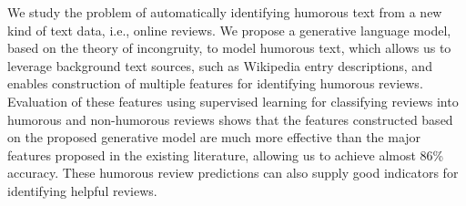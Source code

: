 We study the problem of automatically identifying humorous text from a new kind of text data, i.e., online reviews. We propose a generative language model, based on the theory of incongruity, to model humorous text, which allows us to leverage background text sources, such as Wikipedia entry descriptions, and enables construction of multiple features for identifying humorous reviews. Evaluation of these features using supervised learning for classifying reviews into humorous and non-humorous reviews shows that the features constructed based on the proposed generative model are much more effective than the major features proposed in the existing literature, allowing us to achieve almost 86\% accuracy. These humorous review predictions can also supply good indicators for identifying helpful reviews.
